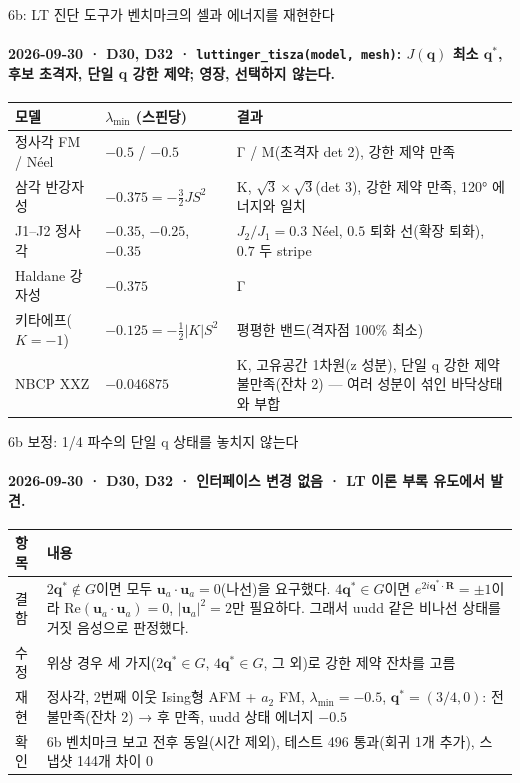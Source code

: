 \begin{frame}[label=stage6b]{6b: LT 진단 도구가 벤치마크의 셀과 에너지를 재현한다}
  \framesubtitle{2026-09-30 · D30, D32 · \texttt{luttinger\_tisza(model, mesh)}: $J(\mathbf q)$ 최소 $\mathbf q^*$, 후보 초격자, 단일 q 강한 제약; 영장, 선택하지 않는다.}
  \footnotesize\renewcommand{\arraystretch}{1.06}
  \begin{tabularx}{\textwidth}{@{}P{3.4cm}P{2.4cm}Y@{}}
    \toprule
    모델 & $\lambda_{\min}$ (스핀당) & 결과 \\
    \midrule
    정사각 FM / Néel & $-0.5$ / $-0.5$ & Γ / M(초격자 det 2), 강한 제약 만족 \\
    삼각 반강자성 & $-0.375=-\tfrac32JS^2$ & K, $\sqrt3\times\sqrt3$(det 3), 강한 제약 만족, 120° 에너지와 일치 \\
    J1--J2 정사각 & $-0.35$, $-0.25$, $-0.35$ & $J_2/J_1=0.3$ Néel, $0.5$ 퇴화 선(확장 퇴화), $0.7$ 두 stripe \\
    Haldane 강자성 & $-0.375$ & Γ \\
    키타에프($K=-1$) & $-0.125=-\tfrac12|K|S^2$ & 평평한 밴드(격자점 100\% 최소) \\
    NBCP XXZ & $-0.046875$ & K, 고유공간 1차원(z 성분), 단일 q 강한 제약 불만족(잔차 2) --- 여러 성분이 섞인 바닥상태와 부합 \\
    \bottomrule
  \end{tabularx}
  \par\smallskip
\end{frame}

\begin{frame}[label=stage6b-quarter]{6b 보정: 1/4 파수의 단일 q 상태를 놓치지 않는다}
  \framesubtitle{2026-09-30 · D30, D32 · 인터페이스 변경 없음 · LT 이론 부록 유도에서 발견.}
  \footnotesize\renewcommand{\arraystretch}{1.08}
  \begin{tabularx}{\textwidth}{@{}P{3.0cm}Y@{}}
    \toprule
    항목 & 내용 \\
    \midrule
    결함 & $2\mathbf q^*\notin G$이면 모두 $\mathbf u_a\cdot\mathbf u_a=0$(나선)을 요구했다. $4\mathbf q^*\in G$이면 $e^{2i\mathbf q^*\cdot\mathbf R}=\pm1$이라 $\mathrm{Re}(\mathbf u_a\cdot\mathbf u_a)=0$, $|\mathbf u_a|^2=2$만 필요하다. 그래서 uudd 같은 비나선 상태를 거짓 음성으로 판정했다. \\
    수정 & 위상 경우 세 가지($2\mathbf q^*\in G$, $4\mathbf q^*\in G$, 그 외)로 강한 제약 잔차를 고름 \\
    재현 & 정사각, 2번째 이웃 Ising형 AFM + $a_2$ FM, $\lambda_{\min}=-0.5$, $\mathbf q^*=(3/4,0)$: 전 불만족(잔차 2) → 후 만족, uudd 상태 에너지 $-0.5$ \\
    확인 & 6b 벤치마크 보고 전후 동일(시간 제외), 테스트 496 통과(회귀 1개 추가), 스냅샷 144개 차이 0 \\
    \bottomrule
  \end{tabularx}
\end{frame}

